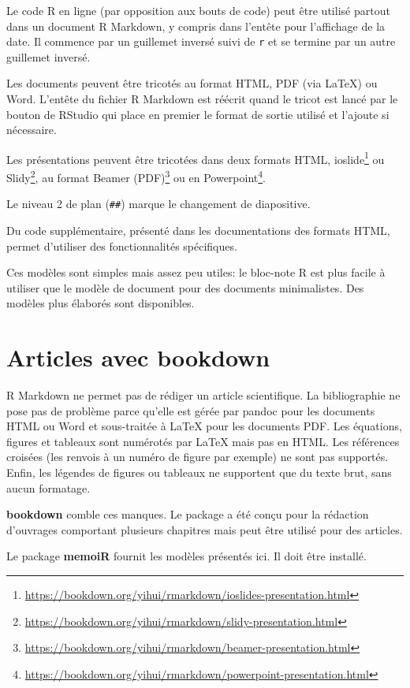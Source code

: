 \documentclass[
  12pt,
  french,
  a4paper,
  extrafontsizes,onecolumn,openright
  ]{memoir}
\begin{document}
Le code R en ligne (par opposition aux bouts de code) peut être utilisé partout dans un document R Markdown, y compris dans l'entête pour l'affichage de la date.
Il commence par un guillemet inversé suivi de \texttt{r} et se termine par un autre guillemet inversé.

Les documents peuvent être tricotés au format HTML, PDF (via LaTeX) ou Word.
L'entête du fichier R Markdown est réécrit quand le tricot est lancé par le bouton de RStudio qui place en premier le format de sortie utilisé et l'ajoute si nécessaire.

Les présentations peuvent être tricotées dans deux formats HTML, ioslide\footnote{\url{https://bookdown.org/yihui/rmarkdown/ioslides-presentation.html}} ou Slidy\footnote{\url{https://bookdown.org/yihui/rmarkdown/slidy-presentation.html}}, au format Beamer (PDF)\footnote{\url{https://bookdown.org/yihui/rmarkdown/beamer-presentation.html}} ou en Powerpoint\footnote{\url{https://bookdown.org/yihui/rmarkdown/powerpoint-presentation.html}}.

Le niveau 2 de plan (\texttt{\#\#}) marque le changement de diapositive.

Du code supplémentaire, présenté dans les documentations des formats HTML, permet d'utiliser des fonctionnalités spécifiques.

Ces modèles sont simples mais assez peu utiles: le bloc-note R est plus facile à utiliser que le modèle de document pour des documents minimalistes.
Des modèles plus élaborés sont disponibles.

\section{Articles avec bookdown}\label{articles-avec-bookdown}

R Markdown ne permet pas de rédiger un article scientifique.
La bibliographie ne pose pas de problème parce qu'elle est gérée par pandoc pour les documents HTML ou Word et sous-traitée à LaTeX pour les documents PDF.
Les équations, figures et tableaux sont numérotés par LaTeX mais pas en HTML.
Les références croisées (les renvois à un numéro de figure par exemple) ne sont pas supportés.
Enfin, les légendes de figures ou tableaux ne supportent que du texte brut, sans aucun formatage.

\textbf{bookdown} comble ces manques.
Le package a été conçu pour la rédaction d'ouvrages comportant plusieurs chapitres mais peut être utilisé pour des articles.

Le package \textbf{memoiR} fournit les modèles présentés ici.
Il doit être installé.
\end{document}
